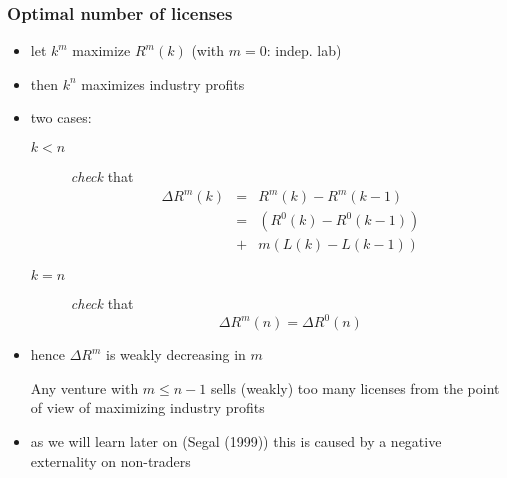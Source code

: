 \documentclass[11pt,english]{beamer}
\begin{document}
\begin{frame}[allowframebreaks]\frametitle{Optimal number of licenses}
\label{sec-2-5}
\begin{itemize}

\item let $k^{m}$ maximize $R^{m}(k)$ (with $m=0$: indep. lab)\\
\label{sec-2-5-1}%
\item then $k^{n}$ maximizes industry profits\\
\label{sec-2-5-2}%
\item two cases:
\label{sec-2-5-3}%
\begin{description}
\item[$k<n$] \emph{check} that
\begin{eqnarray*}
\Delta R^m(k) &=& R^m(k)-R^m(k-1) \\
              &=& (R^0(k)-R^0(k-1)) \\
              &+& m(L(k)-L(k-1))
\end{eqnarray*}
\item[$k=n$] \emph{check} that
\begin{equation*}
\Delta R^m(n) = \Delta R^0(n)
\end{equation*}
\end{description}

\item hence $\Delta R^{m}$ is weakly decreasing in $m$
\label{sec-2-5-4}%
\begin{corollary}
Any venture with $m \leq n-1$ sells (weakly) too many licenses from
the point of view of maximizing industry profits
\end{corollary}

\item as we will learn later on (Segal (1999)) this is caused by a negative externality on non-traders\\
\label{sec-2-5-5}%
\end{itemize} %
\end{frame}
\end{document}
